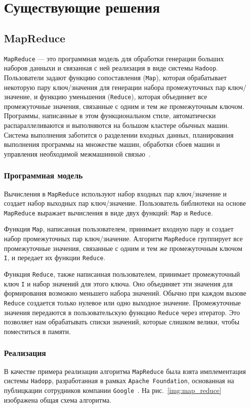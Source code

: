 \section{Существующие решения}
\subsection{MapReduce}

\texttt{MapReduce} --- это программная модель для обработки генерации больших наборов данныхи и связанная с ней реализация в виде системы \texttt{Hadoop}.
Пользователи задают функцию сопоставления (\texttt{Map}), которая обрабатывает некоторую пару ключ/значения для генерации набора промежуточных пар ключ/значение, и функцию уменьшения (\texttt{Reduce}), которая объединяет все промежуточные значения, связанные с одним и тем же промежуточным ключом. 
Программы, написанные в этом функциональном стиле, автоматически распараллеливаются и выполняются на большом кластере обычных машин. 
Система выполнения заботится о разделении входных данных, планирования выполнения программы на множестве машин, обработки сбоев машин и управления необходимой межмашинной связью~\cite{google-mapreduce}.
\subsubsection{Программная модель}

Вычисления в \texttt{MapReduce} используют набор входных пар ключ/значение и создает набор выходных пар ключ/значение. 
Пользователь библиотеки на основе \texttt{MapReduce} выражает вычисления в виде двух функций: \texttt{Map} и \texttt{Reduce}.

Функция \texttt{Map}, написанная пользователем, принимает входную пару и создает набор промежуточных пар ключ/значение. 
Алгоритм \texttt{MapReduce} группирует все промежуточные значения, связанные с одним и тем же промежуточным ключом \texttt{I}, и передает их функции \texttt{Reduce}.

Функция \texttt{Reduce}, также написанная пользователем, принимает промежуточный ключ \texttt{I} и набор значений для этого ключа. 
Оно объединяет эти значения для формирования возможно меньшего набора значений. 
Обычно при каждом вызове \texttt{Reduce} создается только нулевое или одно выходное значение. 
Промежуточные значения передаются в пользовательскую функцию \texttt{Reduce} через итератор.
Это позволяет нам обрабатывать списки значений, которые слишком велики, чтобы поместиться в памяти.

\subsubsection{Реализация}
В качестве примера реализации алгоритма \texttt{MapReduce} была взята имплементация системы \texttt{Hadopp}, разработанная в рамках \texttt{Apache Foundation}, основанная на публицкации сотрудников компании \texttt{Google}~\cite{google-mapreduce}.
На рис.~\ref{img:map_reduce} изображена общая схема алгоритма.%

